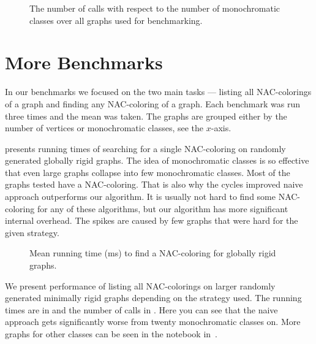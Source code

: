 \begin{figure}[ht]
	\centering
	\scalebox{0.5}{}
	\caption[The number of \IsNACColoring{} calls.]{
		The number of \IsNACColoring{} calls with respect to the number of monochromatic classes
		over all graphs used for benchmarking.}%
	\label{fig:graph_summary}
\end{figure}

\section{More Benchmarks}%
\label{sec:more_benchmarks}

In our benchmarks
we focused on the two main tasks --- listing
all NAC-colorings of a graph and finding any NAC-coloring of a graph.
Each benchmark was run three times and the mean was taken.
The graphs are grouped either by the number of vertices
or monochromatic classes, see the \(x\)-axis.

 presents running times of
searching for a single NAC-coloring on randomly generated globally rigid graphs.
The idea of monochromatic classes is so effective
that even large graphs collapse into few monochromatic classes.
Most of the graphs tested have a NAC-coloring.
That is also why the cycles improved naive approach outperforms
our algorithm. It is usually not hard to find some NAC-coloring
for any of these algorithms, but our algorithm has more significant
internal overhead.
The spikes are caused by few graphs that
were hard for the given strategy.

\begin{figure}[ht]
	\centering
	\scalebox{0.5}{}
	\caption[Running time for globally rigid graphs.]{
		Mean running time (ms) to find a NAC-coloring for globally rigid graphs.}%
	\label{fig:graph_time_globally_rigid}
\end{figure}

We present performance of listing all NAC-colorings
on larger randomly generated minimally rigid graphs depending on the strategy used.
The running times are in 
and the number of \IsNACColoring{} calls in .
Here you can see that the naive approach gets significantly worse from twenty monochromatic classes on.
More graphs for other classes can be seen in the notebook in~\cite{pyrigi_github_lastaapps}.

